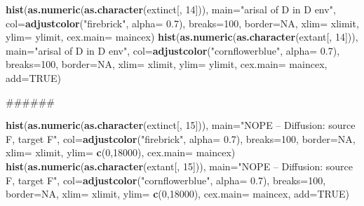 \documentclass[]{book}
\newenvironment{Shaded}{\begin{snugshade}}{\end{snugshade}}
\newcommand{\KeywordTok}[1]{\textcolor[rgb]{0.13,0.29,0.53}{\textbf{{#1}}}}
\newcommand{\DataTypeTok}[1]{\textcolor[rgb]{0.13,0.29,0.53}{{#1}}}
\newcommand{\DecValTok}[1]{\textcolor[rgb]{0.00,0.00,0.81}{{#1}}}
\newcommand{\FloatTok}[1]{\textcolor[rgb]{0.00,0.00,0.81}{{#1}}}
\newcommand{\StringTok}[1]{\textcolor[rgb]{0.31,0.60,0.02}{{#1}}}
\newcommand{\OtherTok}[1]{\textcolor[rgb]{0.56,0.35,0.01}{{#1}}}
\newcommand{\NormalTok}[1]{{#1}}
\theoremstyle{definition}
\theoremstyle{definition}
\theoremstyle{definition}
\theoremstyle{remark}
\begin{document}
\begin{Shaded}
\begin{Highlighting}[]
\KeywordTok{hist}\NormalTok{(}\KeywordTok{as.numeric}\NormalTok{(}\KeywordTok{as.character}\NormalTok{(extinct[, }\DecValTok{14}\NormalTok{])), }\DataTypeTok{main=}\StringTok{"arisal of D in D env"}\NormalTok{, }\DataTypeTok{col=}\KeywordTok{adjustcolor}\NormalTok{(}\StringTok{"firebrick"}\NormalTok{, }\DataTypeTok{alpha=} \FloatTok{0.7}\NormalTok{), }\DataTypeTok{breaks=}\DecValTok{100}\NormalTok{, }\DataTypeTok{border=}\OtherTok{NA}\NormalTok{, }\DataTypeTok{xlim=}\NormalTok{ xlimit, }\DataTypeTok{ylim=}\NormalTok{ ylimit, }\DataTypeTok{cex.main=}\NormalTok{ maincex)}
\KeywordTok{hist}\NormalTok{(}\KeywordTok{as.numeric}\NormalTok{(}\KeywordTok{as.character}\NormalTok{(extant[, }\DecValTok{14}\NormalTok{])), }\DataTypeTok{main=}\StringTok{"arisal of D in D env"}\NormalTok{, }\DataTypeTok{col=}\KeywordTok{adjustcolor}\NormalTok{(}\StringTok{"cornflowerblue"}\NormalTok{, }\DataTypeTok{alpha=} \FloatTok{0.7}\NormalTok{), }\DataTypeTok{breaks=}\DecValTok{100}\NormalTok{, }\DataTypeTok{border=}\OtherTok{NA}\NormalTok{, }\DataTypeTok{xlim=}\NormalTok{ xlimit, }\DataTypeTok{ylim=}\NormalTok{ ylimit, }\DataTypeTok{cex.main=}\NormalTok{ maincex, }\DataTypeTok{add=}\OtherTok{TRUE}\NormalTok{)}

\NormalTok{######}

\KeywordTok{hist}\NormalTok{(}\KeywordTok{as.numeric}\NormalTok{(}\KeywordTok{as.character}\NormalTok{(extinct[, }\DecValTok{15}\NormalTok{])), }\DataTypeTok{main=}\StringTok{"NOPE -- Diffusion: source F, target F"}\NormalTok{, }\DataTypeTok{col=}\KeywordTok{adjustcolor}\NormalTok{(}\StringTok{"firebrick"}\NormalTok{, }\DataTypeTok{alpha=} \FloatTok{0.7}\NormalTok{), }\DataTypeTok{breaks=}\DecValTok{100}\NormalTok{, }\DataTypeTok{border=}\OtherTok{NA}\NormalTok{, }\DataTypeTok{xlim=}\NormalTok{ xlimit, }\DataTypeTok{ylim=} \KeywordTok{c}\NormalTok{(}\DecValTok{0}\NormalTok{,}\DecValTok{18000}\NormalTok{), }\DataTypeTok{cex.main=}\NormalTok{ maincex)}
\KeywordTok{hist}\NormalTok{(}\KeywordTok{as.numeric}\NormalTok{(}\KeywordTok{as.character}\NormalTok{(extant[, }\DecValTok{15}\NormalTok{])), }\DataTypeTok{main=}\StringTok{"NOPE -- Diffusion: source F, target F"}\NormalTok{, }\DataTypeTok{col=}\KeywordTok{adjustcolor}\NormalTok{(}\StringTok{"cornflowerblue"}\NormalTok{, }\DataTypeTok{alpha=} \FloatTok{0.7}\NormalTok{), }\DataTypeTok{breaks=}\DecValTok{100}\NormalTok{, }\DataTypeTok{border=}\OtherTok{NA}\NormalTok{, }\DataTypeTok{xlim=}\NormalTok{ xlimit, }\DataTypeTok{ylim=} \KeywordTok{c}\NormalTok{(}\DecValTok{0}\NormalTok{,}\DecValTok{18000}\NormalTok{), }\DataTypeTok{cex.main=}\NormalTok{ maincex, }\DataTypeTok{add=}\OtherTok{TRUE}\NormalTok{)}




\end{Highlighting}
\end{Shaded}
\end{document}
